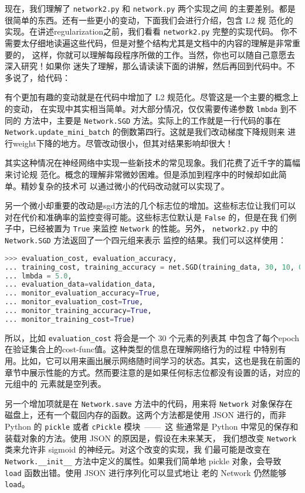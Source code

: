 现在，我们理解了 \lstinline!network2.py! 和 \lstinline!network.py! 两个实现之间
的主要差别。都是很简单的东西。还有一些更小的变动，下面我们会进行介绍，包含 L2 规
范化的实现。在讲述\gls*{regularization}之前，我们看看 \lstinline!network2.py! 完整的实现代码。
你不需要太仔细地读遍这些代码，但是对整个结构尤其是文档中的内容的理解是非常重要的，
这样，你就可以理解每段程序所做的工作。当然，你也可以随自己意愿去深入研究！如果你
迷失了理解，那么请读读下面的讲解，然后再回到代码中。不多说了，给代码：



有个更加有趣的变动就是在代码中增加了 L2 规范化。尽管这是一个主要的概念上的变动，
在实现中其实相当简单。对大部分情况，仅仅需要传递参数 \lstinline!lmbda! 到不同的
方法中，主要是 \lstinline!Network.SGD! 方法。实际上的工作就是一行代码的事在
\lstinline!Network.update_mini_batch! 的倒数第四行。这就是我们改动梯度下降规则来
进行\gls*{weight}下降的地方。尽管改动很小，但其对结果影响却很大！

其实这种情况在神经网络中实现一些新技术的常见现象。我们花费了近千字的篇幅来讨论规
范化。概念的理解非常微妙困难。但是添加到程序中的时候却如此简单。精妙复杂的技术可
以通过微小的代码改动就可以实现了。

另一个微小却重要的改动是\gls*{sgd}方法的几个标志位的增加。这些标志位让我们可以
对在代价和准确率的监控变得可能。这些标志位默认是 \lstinline!False! 的，但是在我
们例子中，已经被置为 \lstinline!True! 来监控 \lstinline!Network! 的性能。另外，
\lstinline!network2.py! 中的 \lstinline!Network.SGD! 方法返回了一个四元组来表示
监控的结果。我们可以这样使用：
\begin{lstlisting}[language=Python]
>>> evaluation_cost, evaluation_accuracy, 
... training_cost, training_accuracy = net.SGD(training_data, 30, 10, 0.5,
... lmbda = 5.0,
... evaluation_data=validation_data,
... monitor_evaluation_accuracy=True,
... monitor_evaluation_cost=True,
... monitor_training_accuracy=True,
... monitor_training_cost=True)
\end{lstlisting}

所以，比如 \lstinline!evaluation_cost! 将会是一个 $30$ 个元素的列表其
中包含了每个\gls*{epoch}在验证集合上的\gls*{cost-func}值。这种类型的信息在理解网络行为的过程
中特别有用。比如，它可以用来画出展示网络随时间学习的状态。其实，这也是我在前面的
章节中展示性能的方式。然而要注意的是如果任何标志位都没有设置的话，对应的元组中的
元素就是空列表。

另一个增加项就是在 \lstinline!Network.save! 方法中的代码，用来将
\lstinline!Network! 对象保存在磁盘上，还有一个载回内存的函数。这两个方法都是使用
JSON 进行的，而非 Python 的 \lstinline!pickle! 或者 \lstinline!cPickle! 模块~——~这
些通常是 Python 中常见的保存和装载对象的方法。使用 JSON 的原因是，假设在未来某天，
我们想改变 \lstinline!Network! 类来允许非 sigmoid 的神经元。对这个改变的实现，我
们最可能是改变在 \lstinline!Network.__init__! 方法中定义的属性。如果我们简单地
pickle 对象，会导致 \lstinline!load! 函数出错。使用 JSON 进行序列化可以显式地让
老的 Network 仍然能够 \lstinline!load!。

